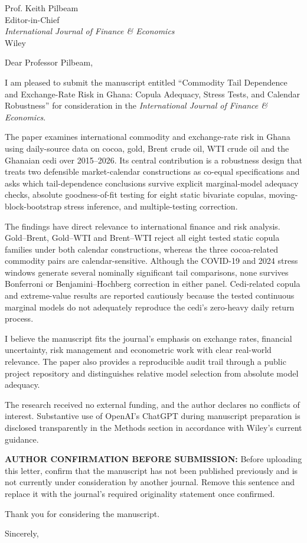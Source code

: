 \documentclass[11pt,a4paper]{letter}
\date{\today}
\begin{document}
\begin{letter}{Prof. Keith Pilbeam\\Editor-in-Chief\\\textit{International Journal of Finance \& Economics}\\Wiley}
\opening{Dear Professor Pilbeam,}

I am pleased to submit the manuscript entitled ``Commodity Tail Dependence and Exchange-Rate Risk in Ghana: Copula Adequacy, Stress Tests, and Calendar Robustness'' for consideration in the \textit{International Journal of Finance \& Economics}.

The paper examines international commodity and exchange-rate risk in Ghana using daily-source data on cocoa, gold, Brent crude oil, WTI crude oil and the Ghanaian cedi over 2015--2026. Its central contribution is a robustness design that treats two defensible market-calendar constructions as co-equal specifications and asks which tail-dependence conclusions survive explicit marginal-model adequacy checks, absolute goodness-of-fit testing for eight static bivariate copulas, moving-block-bootstrap stress inference, and multiple-testing correction.

The findings have direct relevance to international finance and risk analysis. Gold--Brent, Gold--WTI and Brent--WTI reject all eight tested static copula families under both calendar constructions, whereas the three cocoa-related commodity pairs are calendar-sensitive. Although the COVID-19 and 2024 stress windows generate several nominally significant tail comparisons, none survives Bonferroni or Benjamini--Hochberg correction in either panel. Cedi-related copula and extreme-value results are reported cautiously because the tested continuous marginal models do not adequately reproduce the cedi's zero-heavy daily return process.

I believe the manuscript fits the journal's emphasis on exchange rates, financial uncertainty, risk management and econometric work with clear real-world relevance. The paper also provides a reproducible audit trail through a public project repository and distinguishes relative model selection from absolute model adequacy.

The research received no external funding, and the author declares no conflicts of interest. Substantive use of OpenAI's ChatGPT during manuscript preparation is disclosed transparently in the Methods section in accordance with Wiley's current guidance.

\textbf{AUTHOR CONFIRMATION BEFORE SUBMISSION:} Before uploading this letter, confirm that the manuscript has not been published previously and is not currently under consideration by another journal. Remove this sentence and replace it with the journal's required originality statement once confirmed.

Thank you for considering the manuscript.

\closing{Sincerely,}
\end{letter}
\end{document}
